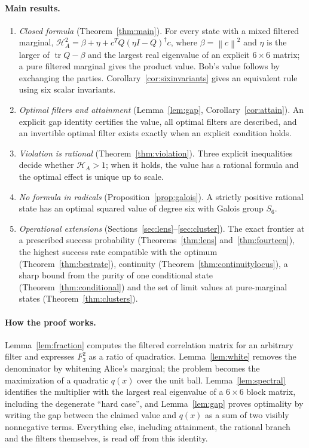 \documentclass[11pt]{article}
\theoremstyle{remark}\newtheorem{remark}[theorem]{Remark}
\newcommand{\tr}{\operatorname{tr}}
\newcommand{\HF}{\mathcal H}
\newcommand{\norm}[1]{\left\lVert#1\right\rVert}
\begin{document}
\paragraph{Main results.}
\begin{enumerate}
\item \emph{Closed formula} (Theorem~\ref{thm:main}). For every state with a
mixed filtered marginal,
$\HF_A^2=\beta+\eta+c^TQ(\eta I-Q)^\dagger c$, where $\beta=\norm c^2$ and
$\eta$ is the larger of $\tr Q-\beta$ and the largest real eigenvalue of an
explicit $6\times6$ matrix; a pure filtered marginal gives the product
value. Bob's value follows by exchanging the parties.
Corollary~\ref{cor:sixinvariants} gives an equivalent rule using six scalar
invariants.
\item \emph{Optimal filters and attainment} (Lemma~\ref{lem:gap},
Corollary~\ref{cor:attain}). An explicit gap identity certifies the value,
all optimal filters are described, and an invertible optimal filter exists
exactly when an explicit condition holds.
\item \emph{Violation is rational} (Theorem~\ref{thm:violation}). Three
explicit inequalities decide whether $\HF_A>1$; when it holds, the value has
a rational formula and the optimal effect is unique up to scale.
\item \emph{No formula in radicals} (Proposition~\ref{prop:galois}). A
strictly positive rational state has an optimal squared value of degree six
with Galois group $S_6$.
\item \emph{Operational extensions} (Sections~\ref{sec:lens}--\ref{sec:cluster}). The exact frontier at a
prescribed success probability (Theorems~\ref{thm:lens}
and~\ref{thm:fourteen}), the highest success rate compatible with the
optimum (Theorem~\ref{thm:bestrate}), continuity
(Theorem~\ref{thm:continuitylocus}), a sharp bound from the purity of one
conditional state (Theorem~\ref{thm:conditional}) and the set of limit
values at pure-marginal states (Theorem~\ref{thm:clusters}).
\end{enumerate}

\paragraph{How the proof works.}
Lemma~\ref{lem:fraction} computes the filtered correlation matrix for an
arbitrary filter and expresses $F_3^2$ as a ratio of quadratics.
Lemma~\ref{lem:white} removes the denominator by whitening Alice's marginal;
the problem becomes the maximization of a quadratic $q(x)$ over the unit
ball. Lemma~\ref{lem:spectral} identifies the multiplier with the largest
real eigenvalue of a $6\times6$ block matrix, including the degenerate
``hard case'', and Lemma~\ref{lem:gap} proves optimality by writing the gap
between the claimed value and $q(x)$ as a sum of two visibly nonnegative
terms. Everything else, including attainment, the rational branch and the
filters themselves, is read off from this identity.
\end{document}
